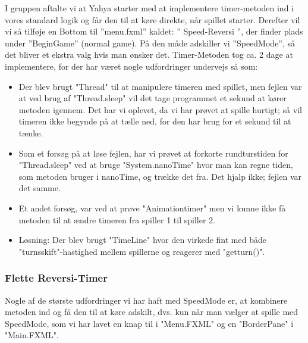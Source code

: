 I gruppen aftalte vi at Yahya starter med at implementere timer-metoden ind i vores standard logik og får den til at køre direkte, når spillet starter. Derefter vil vi så tilføje en Bottom til ”menu.fxml” kaldet: ” Speed-Reversi ”, der finder plads under ”BeginGame” (normal game).
På den måde adskiller vi ”SpeedMode”, så det bliver et ekstra valg hvis man ønsker det. 
Timer-Metoden tog ca. 2 dage at implementere, for der har været nogle udfordringer undervejs så som: 
\begin{itemize}

\item Der blev brugt "Thread" til at manipulere timeren med spillet, men fejlen var at ved brug af "Thread.sleep" vil det tage programmet et sekund at kører metoden igennem. Det har vi oplevet, da vi har prøvet at spille hurtigt; så vil timeren ikke begynde på at tælle ned, for den har brug for et sekund til at tænke. 
\item Som et forsøg på at løse fejlen, har vi prøvet at forkorte rundturstiden for "Thread.sleep" ved at bruge "System.nanoTime" hvor man kan regne tiden, som metoden bruger i nanoTime, og trække det fra. Det hjalp ikke; fejlen var det samme. 
\item Et andet forsøg, var ved at prøve "Animationtimer" men vi kunne ikke få metoden til at ændre timeren fra spiller 1 til spiller 2. 

\item Løsning: 
Der blev brugt "TimeLine" hvor den virkede fint med både "turnsskift"-hastighed mellem spillerne og reagerer med "getturn()". 
\end{itemize}
\subsubsection{Flette Reversi-Timer}\label{FRT}
Nogle af de største udfordringer vi har haft med SpeedMode er, at kombinere metoden ind og få den til at køre adskilt, dvs. kun når man vælger at spille med SpeedMode, som vi har lavet en knap til i "Menu.FXML" og en "BorderPane" i "Main.FXML".
